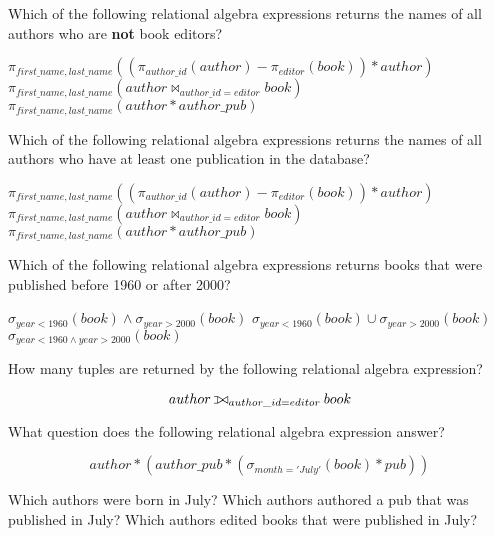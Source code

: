 \documentclass[10pt,a4paper]{exam}
\def\ojoin{\setbox0=\hbox{$\bowtie$}%
  \rule[-.02ex]{.25em}{.4pt}\llap{\rule[\ht0]{.25em}{.4pt}}}
\def\leftouterjoin{\mathbin{\ojoin\mkern-5.8mu\bowtie}}
\begin{document}
\begin{questions}
\question[4] Which of the following relational algebra expressions returns the names of all authors who are {\bf not} book editors?

\begin{choices}
\correctchoice $\pi_{first\_name, last\_name}((\pi_{author\_id}(author)  -  \pi_{editor}(book)) * author)$
\choice $\pi_{first\_name, last\_name}(author \bowtie_{author\_id = editor} book)$
\choice $\pi_{first\_name, last\_name}(author * author\_pub)$
\end{choices}


\question[4] Which of the following relational algebra expressions returns the names of all authors who have at least one publication in the database?

\begin{choices}
\choice $\pi_{first\_name, last\_name}((\pi_{author\_id}(author)  -  \pi_{editor}(book)) * author)$
\choice $\pi_{first\_name, last\_name}(author \bowtie_{author\_id = editor} book)$
\correctchoice $\pi_{first\_name, last\_name}(author * author\_pub)$
\end{choices}


\question[4] Which of the following relational algebra expressions returns books that were published before 1960 or after 2000?

\begin{choices}
\choice $\sigma_{year < 1960}(book) \land \sigma_{year > 2000}(book)$
\correctchoice $\sigma_{year < 1960}(book) \cup \sigma_{year > 2000}(book)$
\choice $\sigma_{year < 1960 \land year > 2000}(book)$
\end{choices}

\question[4] How many tuples are returned by the following relational algebra expression?

\[
author \leftouterjoin_{author\_id = editor} book
\]

\begin{choices}
\end{choices}

\question[4] What question does the following relational algebra expression answer?

\[
author * (author\_pub * (\sigma_{month = 'July'}(book) * pub))
\]

\begin{choices}
\choice Which authors were born in July?
\choice Which authors authored a pub that was published in July?
\choice Which authors edited books that were published in July?
\end{choices}


\end{questions}
\end{document}
